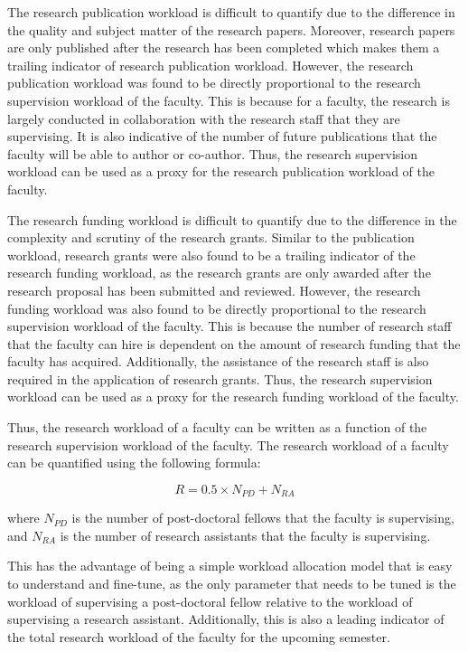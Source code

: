 The research publication workload is difficult to quantify due to the difference in the quality and subject matter of the research papers. Moreover, research papers are only published after the research has been completed which makes them a trailing indicator of research publication workload. However, the research publication workload was found to be directly proportional to the research supervision workload of the faculty. This is because for a faculty, the research is largely conducted in collaboration with the research staff that they are supervising. It is also indicative of the number of future publications that the faculty will be able to author or co-author. Thus, the research supervision workload can be used as a proxy for the research publication workload of the faculty.

The research funding workload is difficult to quantify due to the difference in the complexity and scrutiny of the research grants. Similar to the publication workload, research grants were also found to be a trailing indicator of the research funding workload, as the research grants are only awarded after the research proposal has been submitted and reviewed. However, the research funding workload was also found to be directly proportional to the research supervision workload of the faculty. This is because the number of research staff that the faculty can hire is dependent on the amount of research funding that the faculty has acquired. Additionally, the assistance of the research staff is also required in the application of research grants. Thus, the research supervision workload can be used as a proxy for the research funding workload of the faculty.

Thus, the research workload of a faculty can be written as a function of the research supervision workload of the faculty. The research workload of a faculty can be quantified using the following formula:

\begin{equation*}
  R = 0.5 \times N_{PD} +  N_{RA}
\end{equation*}

where $N_{PD}$ is the number of post-doctoral fellows that the faculty is supervising, and $N_{RA}$ is the number of research assistants that the faculty is supervising.

This has the advantage of being a simple workload allocation model that is easy to understand and fine-tune, as the only parameter that needs to be tuned is the workload of supervising a post-doctoral fellow relative to the workload of supervising a research assistant. Additionally, this is also a leading indicator of the total research workload of the faculty for the upcoming semester.

